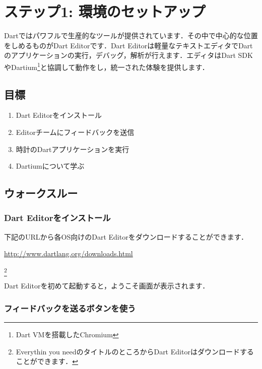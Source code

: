 \chapter*{ステップ1: 環境のセットアップ}
\addtocounter{chapter}{1}

Dartではパワフルで生産的なツールが提供されています．その中で中心的な位置をしめるものがDart Editorです．Dart Editorは軽量なテキストエディタでDartのアプリケーションの実行，デバッグ，解析が行えます．エディタはDart SDKやDartium\footnote{Dart VMを搭載したChromium}と協調して動作をし，統一された体験を提供します．

\section{目標}

\begin{enumerate}
\item Dart Editorをインストール
\item Editorチームにフィードバックを送信
\item 時計のDartアプリケーションを実行
\item Dartiumについて学ぶ
\end{enumerate}

\section{ウォークスルー}

\subsection{Dart Editorをインストール}

下記のURLから各OS向けのDart Editorをダウンロードすることができます．

\vspace{5mm}
\url{http://www.dartlang.org/downloads.html}
\vspace{5mm}

\footnote{Everythin you needのタイトルのところからDart Editorはダウンロードすることができます．}

Dart Editorを初めて起動すると，ようこそ画面が表示されます．


\subsection{フィードバックを送るボタンを使う}

